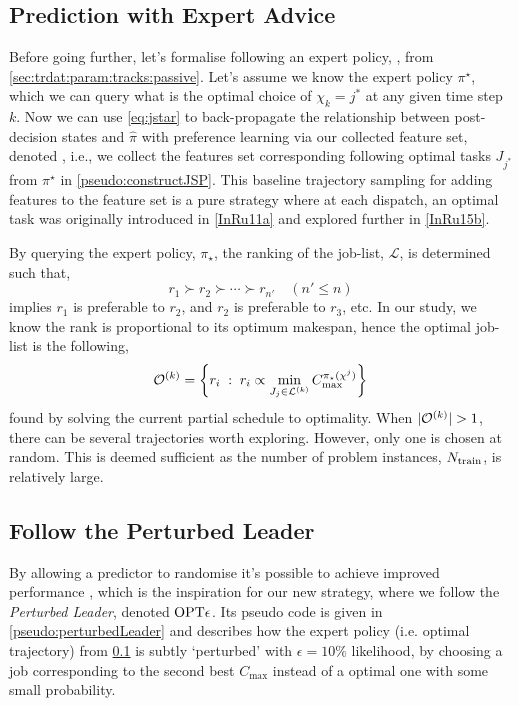 \subsection{Prediction with Expert Advice}\label{sec:expertPolicy}
Before going further, let's formalise following an expert policy, 
\PhiSet{\OPT}, from \cref{sec:trdat:param:tracks:passive}.
Let's assume we know the expert policy $\pi^\star$, which we can query what 
is the optimal choice of $\chi_k={j^*}$ at any given time step $k$. 
Now we can use \cref{eq:jstar} to back-propagate the relationship between 
post-decision states and $\hat{\pi}$ with preference learning via our collected 
feature set, denoted \PhiSet{\OPT}, i.e., we collect the features set 
corresponding following optimal tasks $J_{j^*}$ from $\pi^\star$ in 
\cref{pseudo:constructJSP}.
This baseline trajectory sampling for adding features to the feature set 
is a pure strategy where at each dispatch, an optimal task was originally 
introduced in \cref{InRu11a} and explored further in \cref{InRu15b}. 

By querying the expert policy, $\pi_\star$, the ranking of the job-list, 
$\mathcal{L}$, is determined such that,
\begin{equation}
r_1 \succ r_2 \succ \cdots \succ r_{n'} \quad (n' \leq n)
\end{equation}
implies $r_1$  is preferable to $r_2$, and $r_2$ is preferable to $r_3$, etc. 
In  our study, we know the rank is proportional to its optimum makespan, hence 
the optimal job-list is the following, 
\begin{equation}
\mathcal{O}^{(k)}=\left\{r_i\;:\;r_i \propto \min_{J_j \in \mathcal{L}^{(k)}}
    C_{\max}^{\pi_\star({\mathbf{\chi}}^j)}\right\}
\end{equation}
found by solving the current partial schedule to optimality.
When $\lvert\mathcal{O}^{(k)}\rvert>1$, there can be several trajectories worth 
exploring. However, only one is chosen at random. This is deemed sufficient as 
the number of problem instances, $N_{\text{train}}$, is relatively large.

\subsection{Follow the Perturbed Leader}\label{sec:perturbedLeader}
By allowing a predictor to randomise it's possible to achieve improved 
performance \citep{CesaBianchi06,Hannan57}, which is the inspiration for our 
new strategy, where we follow the \emph{Perturbed Leader}, denoted 
$\text{OPT}\epsilon$. 
Its pseudo code is given in \cref{pseudo:perturbedLeader} and describes how the 
expert policy (i.e. optimal trajectory) from \cref{sec:expertPolicy} is subtly
`perturbed' with $\epsilon=10\%$ likelihood, by choosing a job corresponding 
to the second best $C_{\max}$ instead of a optimal one with some small 
probability. 

